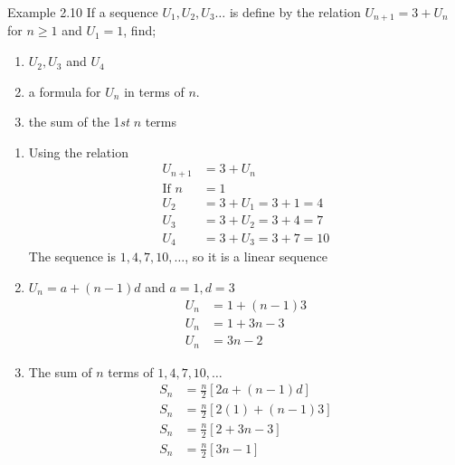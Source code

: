 \begin{example}{Example 2.10}
If a sequence $U_1, U_2, U_3\ldots$ is define by the relation $U_{n+1} = 3 + U_n$ for
$n \ge 1$ and $U_1 = 1$, find;
\begin{enumerate}
  \item[a.] $U_2, U_3$ and $U_4$
  \item[b.] a formula for $U_n$ in terms of $n$.
  \item[c.] the sum of the 1\textit{st} $n$ terms
\end{enumerate}

\solution
\begin{enumerate}
  \item[a.] Using the relation
  \begin{align*}
    U_{n+1} &= 3 + U_n \\
    \text{If } n &= 1 \\
    U_2 &= 3 + U_1 = 3 + 1 = 4 \\
    U_3 &= 3 + U_2 = 3 + 4 = 7 \\
    U_4 &= 3 + U_3 = 3 + 7 = 10
  \end{align*}
  The sequence is $1, 4, 7, 10, \ldots$, so it is a linear sequence
  \item[b.] $U_n = a + (n-1)d$ and $a = 1, d = 3$
  \begin{align*}
    U_n &= 1 + (n-1)3 \\
    U_n &= 1 + 3n - 3 \\
    U_n &= 3n - 2
  \end{align*}
  \item[c.] The sum of $n$ terms of $1, 4, 7, 10, \ldots$
  \begin{align*}
    S_n &= \frac{n}{2}[2a + (n-1)d] \\
    S_n &= \frac{n}{2}[2(1) + (n-1)3] \\
    S_n &= \frac{n}{2}[2 + 3n - 3] \\
    S_n &= \frac{n}{2}[3n - 1]
  \end{align*}
\end{enumerate}
\end{example}

